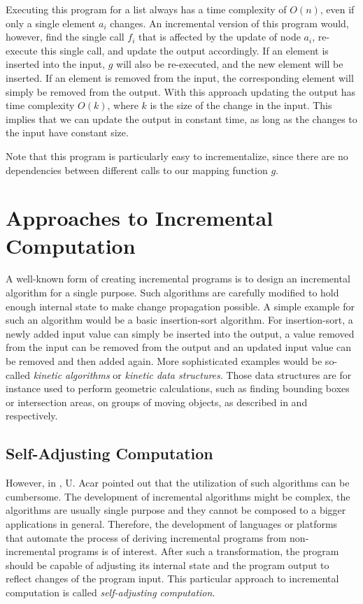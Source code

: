 Executing this program for a list always has a time complexity of $O(n)$, even if only a single element $a_i$ changes. An incremental version of this program would, however, find the single call $f_i$ that is affected by the update of node $a_i$, re-execute this single call, and update the output accordingly. If an element is inserted into the input, $g$ will also be re-executed, and the new element will be inserted. If an element is removed from the input, the corresponding element will simply be removed from the output. With this approach updating the output has time complexity $O(k)$, where $k$ is the size of the change in the input. This implies that we can update the output in constant time, as long as the changes to the input have constant size. 

Note that this program is particularly easy to incrementalize, since there are no dependencies between different calls to our mapping function $g$. 
\section{Approaches to Incremental Computation}


A well-known form of creating incremental programs is to design an incremental algorithm for a single purpose. Such algorithms are carefully modified to hold enough internal state to make change propagation possible. A simple example for such an algorithm would be a basic insertion-sort algorithm. For insertion-sort, a newly added input value can simply be inserted into the output, a value removed from the input can be removed from the output and an updated input value can be removed and then added again. More sophisticated examples would be so-called \textit{kinetic algorithms} or \textit{kinetic data structures}. Those data structures are for instance used to perform geometric calculations, such as finding bounding boxes or intersection areas, on groups of moving objects, as described in \cite{yu2008practical} and \cite{basch2004kinetic} respectively.

\subsection{Self-Adjusting Computation}

However, in \cite{Acar2005thesis}, U. Acar pointed out that the utilization of such algorithms can be cumbersome. The development of incremental algorithms might be complex, the algorithms are usually single purpose and they cannot be composed to a bigger applications in general. Therefore, the development of languages or platforms that automate the process of deriving incremental programs from non-incremental programs is of interest. After such a transformation, the program should be capable of adjusting its internal state and the program output to reflect changes of the program input. This particular approach to incremental computation is called \textit{self-adjusting computation}.


